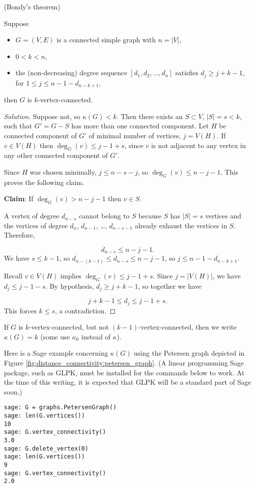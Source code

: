 \begin{theorem}
(Bondy's theorem)
{\rm
Suppose

\begin{itemize}
\item
$G=(V,E)$ is a connected simple graph with $n=|V|$,
\item
$0<k<n$,
\item
the (non-decreasing) degree sequence
$[d_1,d_2,\dots, d_n]$ satisfies
$d_j\geq j+k-1$, for $1\leq j\leq n-1-d_{n-k+1}$,
\end{itemize}
then $G$ is $k$-vertex-connected.
}
\end{theorem}

\begin{proof}[Solution]
Suppose not, so $\kappa(G)<k$. Then there exists an
$S\subset V$, $|S|=s<k$, such that $G'=G-S$ has more
than one connected component. Let $H$ be connected
component of $G'$ of minimal number of
vertices, $j=V(H)$. If $v\in V(H)$ then
$\deg_G(v)\leq j-1+s$, since $v$ is not adjacent to any
vertex in any other connected component of $G'$.

Since $H$ was chosen minimally, $j\leq n-s-j$, so
$\deg_G(v)\leq n-j-1$. This proves the following claim.

\noindent
{\bf Claim}: If $\deg_G(v) > n-j-1$ then $v\in S$.

A vertex of degree $d_{n-s}$ cannot belong to
$S$ because $S$ has $|S|=s$ vertices and the
vertices of degree $d_n$, $d_{n-1}$, \dots,
$d_{n-s-1}$ already exhaust the vertices in $S$. Therefore,

\[
d_{n-s}\leq n-j-1.
\]
We have $s\leq k-1$, so $d_{n-(k-1)}\leq d_{n-s}\leq n-j-1$,
so $j\leq n-1-d_{n-k+1}$.

Recall $v\in V(H)$ implies $\deg_G(v)\leq j-1+s$.
Since $j=|V(H)|$, we have
$d_j\leq j-1-s$.
By hypothesis, $d_j\geq j+k-1$, so together we have

\[
j+k-1\leq d_j \leq j-1+s.
\]
This forces $k\leq s$, a contradiction.
\end{proof}


If $G$ is $k$-vertex-connected, but not
$(k-1)$-vertex-connected, then we write $\kappa(G)=k$
(some use $\kappa_0$ instead of $\kappa$).

Here is a Sage example concerning
$\kappa(G)$ using the Petersen graph
depicted in Figure \ref{fig:distance_connectivity:petersen_graph}.
(A linear programming
Sage package, such as GLPK, must be installed
for the commands below to work. At the time of this writing, it is
expected that GLPK will be a standard part of Sage soon.)
%
\begin{lstlisting}
sage: G = graphs.PetersenGraph()
sage: len(G.vertices())
10
sage: G.vertex_connectivity()
3.0
sage: G.delete_vertex(0)
sage: len(G.vertices())
9
sage: G.vertex_connectivity()
2.0
\end{lstlisting}

